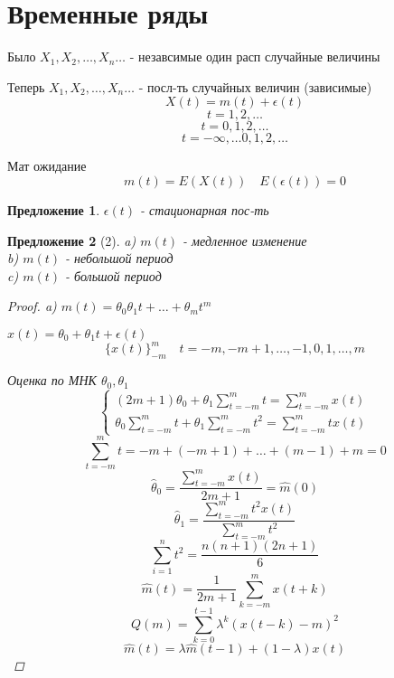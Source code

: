 \documentclass[a4paper]{article}
\newtheorem*{proposal}{Предложение}
\theoremstyle{definition}
\theoremstyle{remark}
\begin{document}
\section*{\centering Временные ряды}

Было $ X_1, X_2, \dots, X_n \dots $ - незавсимые один расп случайные величины

Теперь $ X_1, X_2, \dots, X_n \dots $ - посл-ть случайных величин (зависимые) 
\[
    X(t) = m(t) + \epsilon(t)
\]
\[
    t = 1, 2, \dots
\]
\[
    t = 0, 1, 2, \dots
\]
\[
    t = -\infty, \dots 0, 1, 2, \dots
\]

Мат ожидание
\[
    m(t) = E(X(t)) \quad E(\epsilon(t)) = 0
\]

\begin{tcolorbox}
\begin{proposal}
    $ \epsilon(t) $ - стационарная пос-ть
\end{proposal}
\end{tcolorbox}

\begin{tcolorbox}
    \begin{proposal}[2]
        a) $ m(t) $ - медленное изменение\\
        b) $ m(t) $ - небольшой период\\
        c) $ m(t) $ - большой период

        \begin{proof}
            a) $ m(t) = \theta_0 \theta_1 t + \dots + \theta_m t^{m} $

            $ x(t) = \theta_0 + \theta_1 t + \epsilon(t) $ 
            \[
                \{ x(t) \}_{-m}^{m} \quad t = -m, -m + 1, \dots , -1, 0, 1, \dots, m
            \]

            Оценка по МНК $ \theta_0, \theta_1 $ 
            \[
                \begin{cases}
                    (2m+1)\theta_0 + \theta_1 \sum_{t=-m}^{m} t = \sum_{t=-m}^{m} x(t)\\
                    \theta_0\sum_{t=-m}^{m} t + \theta_1 
                    \sum_{t=-m}^{m} t^2 = \sum_{t=-m}^{m} t x(t)
                \end{cases}
            \]
            \[
                \sum_{t=-m}^{m} t = -m + (-m + 1) + \dots + (m-1) + m = 0
            \]
            \[
                \hat{\theta}_0 = \frac{\sum_{t=-m}^{m}x(t)}{2m+1} = \hat{m}(0) 
            \]
            \[
                \hat{\theta}_1 = \frac{\sum_{t=-m}^{m}t^2x(t)}{\sum_{t=-m}^{m}t^2} 
            \]
            \[
                \sum_{i=1}^{n} t^2 = \frac{n(n+1)(2n+1)}{6} 
            \]
            \[
                \hat{m}(t) = \frac{1}{2m+1} \sum_{k=-m}^{m} x(t+k)
            \]
            \[
                Q(m)  =\sum_{k=0}^{t-1} \lambda^{k} (x(t-k) - m)^2
            \]
            \[
                \hat{m}(t) = \lambda \hat{m}(t-1) + (1 - \lambda) x(t)
            \]
        \end{proof}
\end{proposal}
\end{tcolorbox}
\end{document}

